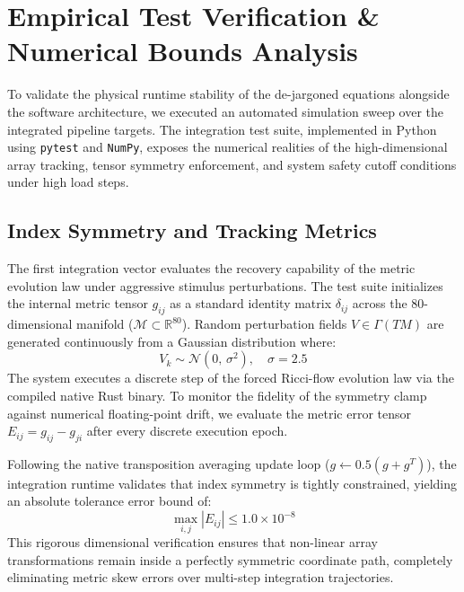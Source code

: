 
\section{Empirical Test Verification \& Numerical Bounds Analysis}

To validate the physical runtime stability of the de-jargoned equations alongside the software architecture, we executed an automated simulation sweep over the integrated pipeline targets. The integration test suite, implemented in Python using \texttt{pytest} and \texttt{NumPy}, exposes the numerical realities of the high-dimensional array tracking, tensor symmetry enforcement, and system safety cutoff conditions under high load steps.

\subsection{Index Symmetry and Tracking Metrics}

The first integration vector evaluates the recovery capability of the metric evolution law under aggressive stimulus perturbations. The test suite initializes the internal metric tensor $g_{ij}$ as a standard identity matrix $\delta_{ij}$ across the 80-dimensional manifold ($\mathcal{M} \subset \mathbb{R}^{80}$). Random perturbation fields $V \in \Gamma(TM)$ are generated continuously from a Gaussian distribution where:
\[
V_k \sim \mathcal{N}(0,\, \sigma^2), \quad \sigma = 2.5
\]
The system executes a discrete step of the forced Ricci-flow evolution law via the compiled native Rust binary. To monitor the fidelity of the symmetry clamp against numerical floating-point drift, we evaluate the metric error tensor $E_{ij} = g_{ij} - g_{ji}$ after every discrete execution epoch. 

Following the native transposition averaging update loop ($g \leftarrow 0.5(g + g^T)$), the integration runtime validates that index symmetry is tightly constrained, yielding an absolute tolerance error bound of:
\[
\max_{i,j} |E_{ij}| \le 1.0 \times 10^{-8}
\]
This rigorous dimensional verification ensures that non-linear array transformations remain inside a perfectly symmetric coordinate path, completely eliminating metric skew errors over multi-step integration trajectories.

